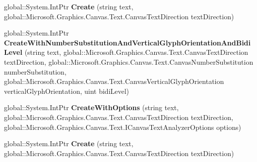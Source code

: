 \begin{DoxyCompactItemize}
\item 
\mbox{\label{interface_microsoft_1_1_graphics_1_1_canvas_1_1_text_1_1_i_canvas_text_analyzer_factory_aec5674841ed2329598eb2ed3e89170f7}} 
global\+::\+System.\+Int\+Ptr {\bfseries Create} (string text, global\+::\+Microsoft.\+Graphics.\+Canvas.\+Text.\+Canvas\+Text\+Direction text\+Direction)
\item 
\mbox{\label{interface_microsoft_1_1_graphics_1_1_canvas_1_1_text_1_1_i_canvas_text_analyzer_factory_ab3d7e254f0ceac4bdd660a9922c725f7}} 
global\+::\+System.\+Int\+Ptr {\bfseries Create\+With\+Number\+Substitution\+And\+Vertical\+Glyph\+Orientation\+And\+Bidi\+Level} (string text, global\+::\+Microsoft.\+Graphics.\+Canvas.\+Text.\+Canvas\+Text\+Direction text\+Direction, global\+::\+Microsoft.\+Graphics.\+Canvas.\+Text.\+Canvas\+Number\+Substitution number\+Substitution, global\+::\+Microsoft.\+Graphics.\+Canvas.\+Text.\+Canvas\+Vertical\+Glyph\+Orientation vertical\+Glyph\+Orientation, uint bidi\+Level)
\item 
\mbox{\label{interface_microsoft_1_1_graphics_1_1_canvas_1_1_text_1_1_i_canvas_text_analyzer_factory_a40e77ae7b0745b17858257c35808df74}} 
global\+::\+System.\+Int\+Ptr {\bfseries Create\+With\+Options} (string text, global\+::\+Microsoft.\+Graphics.\+Canvas.\+Text.\+Canvas\+Text\+Direction text\+Direction, global\+::\+Microsoft.\+Graphics.\+Canvas.\+Text.\+I\+Canvas\+Text\+Analyzer\+Options options)
\item 
\mbox{\label{interface_microsoft_1_1_graphics_1_1_canvas_1_1_text_1_1_i_canvas_text_analyzer_factory_aec5674841ed2329598eb2ed3e89170f7}} 
global\+::\+System.\+Int\+Ptr {\bfseries Create} (string text, global\+::\+Microsoft.\+Graphics.\+Canvas.\+Text.\+Canvas\+Text\+Direction text\+Direction)
\item 
\mbox{\label{interface_microsoft_1_1_graphics_1_1_canvas_1_1_text_1_1_i_canvas_text_analyzer_factory_ab3d7e254f0ceac4bdd660a9922c725f7}} 

\end{DoxyCompactItemize}

